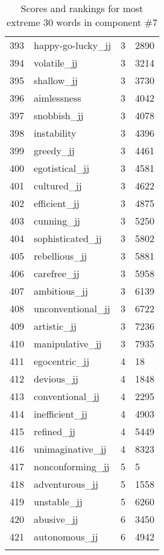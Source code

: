 \begin{longtable}[!htbp]{| rlr@{.}l |}
    393 & happy-go-lucky\_jj & 3 & 2890 \\
    394 & volatile\_jj & 3 & 3214 \\
    395 & shallow\_jj & 3 & 3730 \\
    396 & aimlessness & 3 & 4042 \\
    397 & snobbish\_jj & 3 & 4078 \\
    398 & instability & 3 & 4396 \\
    399 & greedy\_jj & 3 & 4461 \\
    400 & egotistical\_jj & 3 & 4581 \\
    401 & cultured\_jj & 3 & 4622 \\
    402 & efficient\_jj & 3 & 4875 \\
    403 & cunning\_jj & 3 & 5250 \\
    404 & sophisticated\_jj & 3 & 5802 \\
    405 & rebellious\_jj & 3 & 5881 \\
    406 & carefree\_jj & 3 & 5958 \\
    407 & ambitious\_jj & 3 & 6139 \\
    408 & unconventional\_jj & 3 & 6722 \\
    409 & artistic\_jj & 3 & 7236 \\
    410 & manipulative\_jj & 3 & 7935 \\
    411 & egocentric\_jj & 4 & 18 \\
    412 & devious\_jj & 4 & 1848 \\
    413 & conventional\_jj & 4 & 2295 \\
    414 & inefficient\_jj & 4 & 4903 \\
    415 & refined\_jj & 4 & 5449 \\
    416 & unimaginative\_jj & 4 & 8323 \\
    417 & nonconforming\_jj & 5 & 5 \\
    418 & adventurous\_jj & 5 & 1558 \\
    419 & unstable\_jj & 5 & 6260 \\
    420 & abusive\_jj & 6 & 3450 \\
    421 & autonomous\_jj & 6 & 4942 \\
    \hline
    \caption{Scores and rankings for most extreme 30 words in component \#7} \\
\end{longtable}
